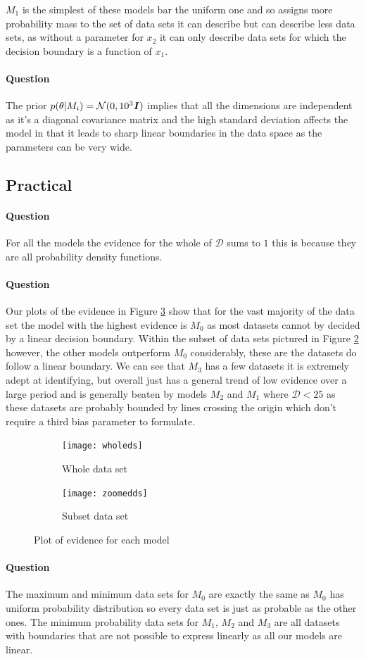 \documentclass{article}
\newcounter{question}
\newcommand{\question}{\stepcounter{question}\paragraph{Question \thequestion}}
\newcommand{\mat}[1]{\textbf{\textit{#1}}}
\begin{document}
$M_1$ is the simplest of these models bar the uniform one and so assigns more probability mass to the set of data sets it can describe but can describe less data sets, as without a parameter for $x_2$ it can only describe data sets for which the decision boundary is a function of $x_1$.
\question The prior $p(\theta|M_i) = \mathcal{N}(0, 10^3\mat{I})$ implies that all the dimensions are independent as it's a diagonal covariance matrix and the high standard deviation affects the model in that it leads to sharp linear boundaries in the data space as the parameters can be very wide.
\subsection{Practical}
\question For all the models the evidence for the whole of $\mathcal{D}$ sums to $1$ this is because they are all probability density functions.
\question Our plots of the evidence in Figure \ref{fig:ds} show that for the vast majority of the data set the model with the highest evidence is $M_0$ as most datasets cannot by decided by a linear decision boundary. Within the subset of data sets pictured in Figure \ref{fig:zoomedds} however, the other models outperform $M_0$ considerably, these are the datasets do follow a linear boundary. We can see that $M_3$ has a few datasets it is extremely adept at identifying, but overall just has a general trend of low evidence over a large period and is generally beaten by models $M_2$ and $M_1$ where $\mathcal{D} < 25$ as these datasets are probably bounded by lines crossing the origin which don't require a third bias parameter to formulate.
\begin{figure}[H]
	\centering
	\begin{subfigure}[t]{0.4\linewidth}
		\texttt{[image: wholeds]}
		\caption{Whole data set}
		\label{fig:wholeds}
	\end{subfigure}
	\begin{subfigure}[t]{0.4\linewidth}
		\texttt{[image: zoomedds]}
		\caption{Subset data set}
		\label{fig:zoomedds}
	\end{subfigure}
	\caption{Plot of evidence for each model}
	\label{fig:ds}
\end{figure}
\question The maximum and minimum data sets for $M_0$ are exactly the same as $M_0$ has uniform probability distribution so every data set is just as probable as the other ones. The minimum probability data sets for $M_1$, $M_2$ and $M_3$ are all datasets with boundaries that are not possible to express linearly as all our models are linear.
\end{document}
